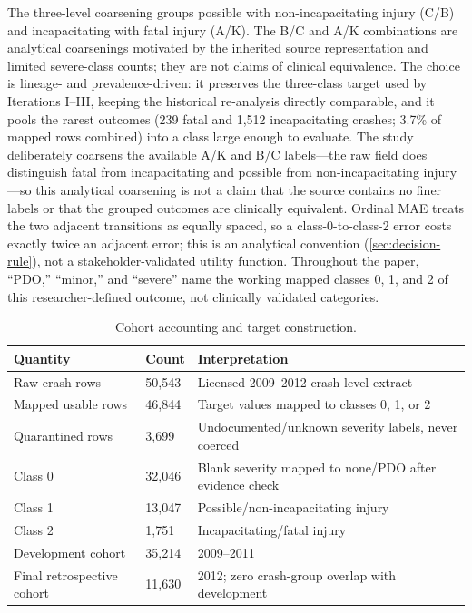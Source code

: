 \documentclass[11pt,letterpaper]{article}
\newcommand{\tabnote}[1]{\par\vspace{3pt}{\footnotesize\singlespacing\itshape #1\par}}
\begin{document}
The three-level coarsening groups possible with non-incapacitating injury (C/B) and incapacitating with fatal injury (A/K). The B/C and A/K combinations are analytical coarsenings motivated by the inherited source representation and limited severe-class counts; they are not claims of clinical equivalence. The choice is lineage- and prevalence-driven: it preserves the three-class target used by Iterations I--III, keeping the historical re-analysis directly comparable, and it pools the rarest outcomes (239 fatal and 1,512 incapacitating crashes; 3.7\% of mapped rows combined) into a class large enough to evaluate. The study deliberately coarsens the available A/K and B/C labels---the raw field does distinguish fatal from incapacitating and possible from non-incapacitating injury---so this analytical coarsening is not a claim that the source contains no finer labels or that the grouped outcomes are clinically equivalent. Ordinal MAE treats the two adjacent transitions as equally spaced, so a class-0-to-class-2 error costs exactly twice an adjacent error; this is an analytical convention (\cref{sec:decision-rule}), not a stakeholder-validated utility function. Throughout the paper, ``PDO,'' ``minor,'' and ``severe'' name the working mapped classes 0, 1, and 2 of this researcher-defined outcome, not clinically validated categories.

\begin{table}[htbp]
\centering
\caption{Cohort accounting and target construction.}
\label{tab:cohort}
\begin{tabularx}{0.91\textwidth}{@{}Y R{0.17\textwidth} Y@{}}
\toprule
\textbf{Quantity} & \textbf{Count} & \textbf{Interpretation} \\
\midrule
Raw crash rows & 50,543 & Licensed 2009--2012 crash-level extract \\
Mapped usable rows & 46,844 & Target values mapped to classes 0, 1, or 2 \\
Quarantined rows & 3,699 & Undocumented/unknown severity labels, never coerced \\
Class 0 & 32,046 & Blank severity mapped to none/PDO after evidence check \\
Class 1 & 13,047 & Possible/non-incapacitating injury \\
Class 2 & 1,751 & Incapacitating/fatal injury \\
Development cohort & 35,214 & 2009--2011 \\
Final retrospective cohort & 11,630 & 2012; zero crash-group overlap with development \\
\bottomrule
\end{tabularx}
\tabnote{PDO = property-damage-only. Classes 0/1/2 are the working mapped classes of the researcher-defined recorded-severity outcome. The blank-to-PDO rule constitutes all of class 0 in this extract: the raw field contains no explicit no-injury value (63.4\% of source rows; 68.4\% of mapped rows).}
\end{table}
\end{document}
